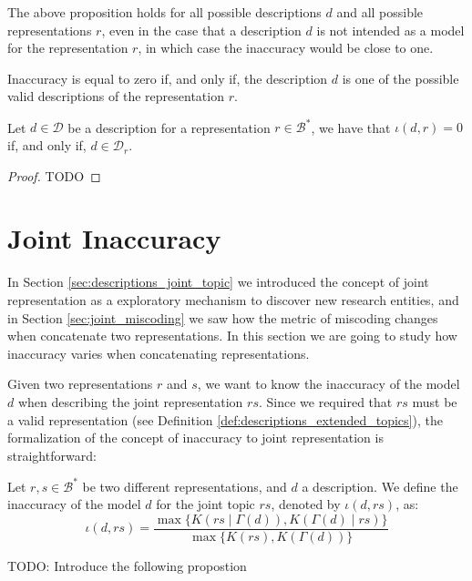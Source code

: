 The above proposition holds for all possible descriptions $d$ and all possible representations $r$, even in the case that a description $d$ is not intended as a model for the representation $r$, in which case the inaccuracy would be close to one.

Inaccuracy is equal to zero if, and only if, the description $d$ is one of the possible valid descriptions of the representation $r$.

\begin{proposition}\label{prop:perfect_description}
Let $d \in \mathcal{D}$ be a description for a representation $r \in \mathcal{B}^\ast$, we have that $\iota(d, r) = 0$ if, and only if, $d \in \mathcal{D}_r$.
\end{proposition}
\begin{proof}
{\color{red} TODO}
\end{proof}

%
%

\section{Joint Inaccuracy}

In Section \ref{sec:descriptions_joint_topic} we introduced the concept of joint representation as a exploratory mechanism to discover new research entities, and in Section \ref{sec:joint_miscoding} we saw how the metric of miscoding changes when concatenate two representations. In this section we are going to study how inaccuracy varies when concatenating representations.

Given two representations $r$ and $s$, we want to know the inaccuracy of the model $d$ when describing the joint representation $rs$. Since we required that $rs$ must be a valid representation (see Definition \ref{def:descriptions_extended_topics}), the formalization of the concept of inaccuracy to joint representation is straightforward:

\begin{definition}
\label{def:inaccuracy_joint_representation}
Let $r, s \in \mathcal{B}^\ast$ be two different representations, and $d$ a description. We define the inaccuracy of the model $d$ for the joint topic $rs$, denoted by $\iota(d, rs)$, as:
\[
\iota(d, rs) = \frac{ \max\{ K \left(rs \mid \Gamma(d) \right), K \left( \Gamma(d) \mid rs \right) \} } { \max\{ K(rs), K \left(\Gamma(d) \right) \} }
\]
\end{definition}

{\color{red} TODO: Introduce the following propostion}

